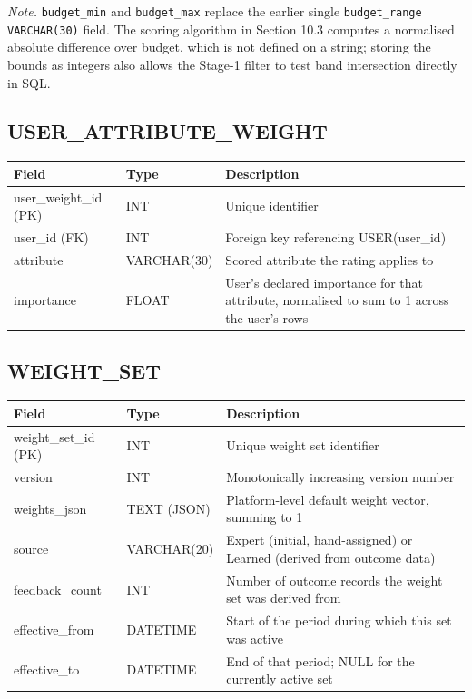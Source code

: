 \documentclass[12pt,a4paper]{report}
\begin{document}
\vspace{2mm}
\noindent\textit{Note.} \texttt{budget\_min} and \texttt{budget\_max} replace the earlier single \texttt{budget\_range VARCHAR(30)} field. The scoring algorithm in Section 10.3 computes a normalised absolute difference over budget, which is not defined on a string; storing the bounds as integers also allows the Stage-1 filter to test band intersection directly in SQL.

\subsection*{USER\_ATTRIBUTE\_WEIGHT}
\begin{longtable}{L{3.2cm}L{2.5cm}L{8.5cm}}
\toprule
\textbf{Field} & \textbf{Type} & \textbf{Description} \\
\midrule
\endhead
user\_weight\_id (PK) & INT & Unique identifier \\
user\_id (FK) & INT & Foreign key referencing USER(user\_id) \\
attribute & VARCHAR(30) & Scored attribute the rating applies to \\
importance & FLOAT & User's declared importance for that attribute, normalised to sum to 1 across the user's rows \\
\bottomrule
\end{longtable}

\subsection*{WEIGHT\_SET}
\begin{longtable}{L{3.2cm}L{2.5cm}L{8.5cm}}
\toprule
\textbf{Field} & \textbf{Type} & \textbf{Description} \\
\midrule
\endhead
weight\_set\_id (PK) & INT & Unique weight set identifier \\
version & INT & Monotonically increasing version number \\
weights\_json & TEXT (JSON) & Platform-level default weight vector, summing to 1 \\
source & VARCHAR(20) & Expert (initial, hand-assigned) or Learned (derived from outcome data) \\
feedback\_count & INT & Number of outcome records the weight set was derived from \\
effective\_from & DATETIME & Start of the period during which this set was active \\
effective\_to & DATETIME & End of that period; NULL for the currently active set \\
\bottomrule
\end{longtable}
\end{document}
